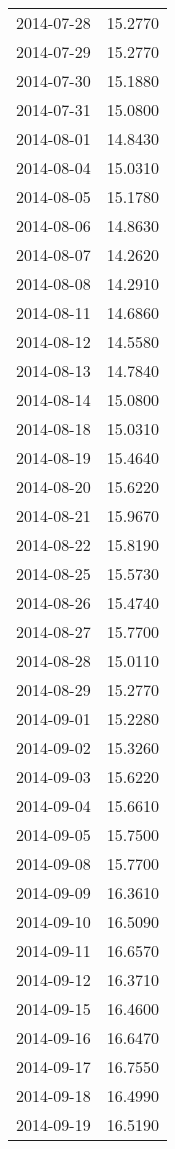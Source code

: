 \begin{tabular}{lr}
2014-07-28 &     15.2770 \\
2014-07-29 &     15.2770 \\
2014-07-30 &     15.1880 \\
2014-07-31 &     15.0800 \\
2014-08-01 &     14.8430 \\
2014-08-04 &     15.0310 \\
2014-08-05 &     15.1780 \\
2014-08-06 &     14.8630 \\
2014-08-07 &     14.2620 \\
2014-08-08 &     14.2910 \\
2014-08-11 &     14.6860 \\
2014-08-12 &     14.5580 \\
2014-08-13 &     14.7840 \\
2014-08-14 &     15.0800 \\
2014-08-18 &     15.0310 \\
2014-08-19 &     15.4640 \\
2014-08-20 &     15.6220 \\
2014-08-21 &     15.9670 \\
2014-08-22 &     15.8190 \\
2014-08-25 &     15.5730 \\
2014-08-26 &     15.4740 \\
2014-08-27 &     15.7700 \\
2014-08-28 &     15.0110 \\
2014-08-29 &     15.2770 \\
2014-09-01 &     15.2280 \\
2014-09-02 &     15.3260 \\
2014-09-03 &     15.6220 \\
2014-09-04 &     15.6610 \\
2014-09-05 &     15.7500 \\
2014-09-08 &     15.7700 \\
2014-09-09 &     16.3610 \\
2014-09-10 &     16.5090 \\
2014-09-11 &     16.6570 \\
2014-09-12 &     16.3710 \\
2014-09-15 &     16.4600 \\
2014-09-16 &     16.6470 \\
2014-09-17 &     16.7550 \\
2014-09-18 &     16.4990 \\
2014-09-19 &     16.5190 \\

\end{tabular}
